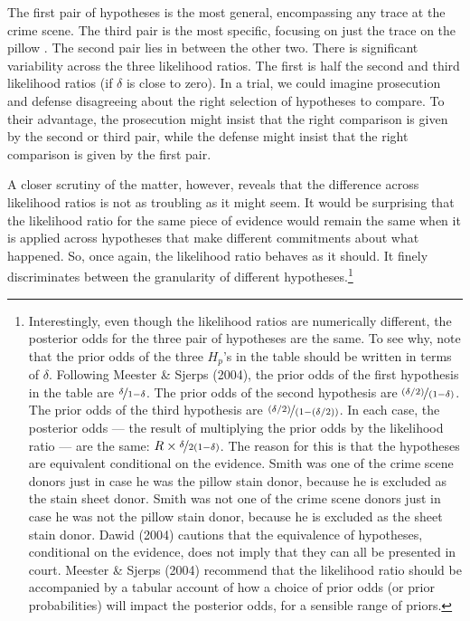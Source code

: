 \documentclass[
  letterpaper,
  DIV=11,
  numbers=noendperiod]{scrartcl}
\begin{document}
\noindent The first pair of hypotheses is the most general, encompassing
any trace at the crime scene. The third pair is the most specific,
focusing on just the trace on the pillow . The second pair lies in
between the other two. There is significant variability across the three
likelihood ratios. The first is half the second and third likelihood
ratios (if \(\delta\) is close to zero). In a trial, we could imagine
prosecution and defense disagreeing about the right selection of
hypotheses to compare. To their advantage, the prosecution might insist
that the right comparison is given by the second or third pair, while
the defense might insist that the right comparison is given by the first
pair.

A closer scrutiny of the matter, however, reveals that the difference
across likelihood ratios is not as troubling as it might seem. It would
be surprising that the likelihood ratio for the same piece of evidence
would remain the same when it is applied across hypotheses that make
different commitments about what happened. So, once again, the
likelihood ratio behaves as it should. It finely discriminates between
the granularity of different hypotheses.\footnote{Interestingly, even
  though the likelihood ratios are numerically different, the posterior
  odds for the three pair of hypotheses are the same. To see why, note
  that the prior odds of the three \(H_p\)'s in the table should be
  written in terms of \(\delta\). Following Meester \& Sjerps (2004),
  the prior odds of the first hypothesis in the table are
  \(\nicefrac{\delta}{1-\delta}\). The prior odds of the second
  hypothesis are \(\nicefrac{(\delta/2)}{(1-\delta)}\). The prior odds
  of the third hypothesis are \(\nicefrac{(\delta/2)}{(1-(\delta/2))}\).
  In each case, the posterior odds --- the result of multiplying the
  prior odds by the likelihood ratio --- are the same:
  \(R\times \nicefrac{\delta}{2(1-\delta)}\). The reason for this is
  that the hypotheses are equivalent conditional on the evidence. Smith
  was one of the crime scene donors just in case he was the pillow stain
  donor, because he is excluded as the stain sheet donor. Smith was not
  one of the crime scene donors just in case he was not the pillow stain
  donor, because he is excluded as the sheet stain donor. Dawid (2004)
  cautions that the equivalence of hypotheses, conditional on the
  evidence, does not imply that they can all be presented in court.
  Meester \& Sjerps (2004) recommend that the likelihood ratio should be
  accompanied by a tabular account of how a choice of prior odds (or
  prior probabilities) will impact the posterior odds, for a sensible
  range of priors.}
\end{document}
